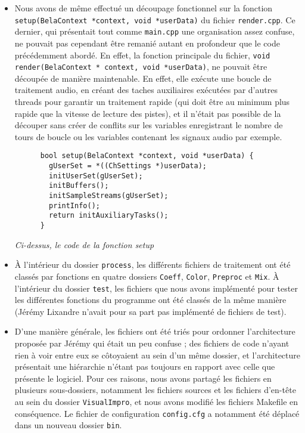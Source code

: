 \begin{itemize}
    \item Nous avons de même effectué un découpage fonctionnel sur la
      fonction \\ \verb!setup(BelaContext *context, void *userData)!
      du fichier \verb!render.cpp!. Ce dernier, qui présentait tout
      comme \verb!main.cpp! une organisation assez confuse, ne pouvait
      pas cependant être remanié autant en profondeur que le code
      précédemment abordé. En effet, la fonction principale du
      fichier, \verb!void!
      \\ \verb!render(BelaContext * context, void *userData)!, ne
      pouvait être découpée de manière maintenable. En effet, elle
      exécute une boucle de traitement audio, en créant des taches
      auxiliaires exécutées par d'autres threads pour garantir un
      traitement rapide (qui doit être au minimum plus rapide que la
      vitesse de lecture des pistes), et il n'était pas possible de la
      découper sans créer de conflits sur les variables enregistrant
      le nombre de tours de boucle ou les variables contenant les
      signaux audio par exemple.

      \begin{lstlisting}
      bool setup(BelaContext *context, void *userData) {
        gUserSet = *((ChSettings *)userData);
        initUserSet(gUserSet);
        initBuffers();
        initSampleStreams(gUserSet);
        printInfo();
        return initAuxiliaryTasks();
      }
    \end{lstlisting}

    \begin{center}
      \textit{Ci-dessus, le code de la fonction setup}
    \end{center}    

      \item \`{A} l'intérieur du dossier \verb!process!, les
        différents fichiers de traitement ont été classés par
        fonctions en quatre dossiers \verb!Coeff!, \verb!Color!,
        \verb!Preproc! et \verb!Mix!. \`{A} l'intérieur du dossier
        \verb!test!, les fichiers que nous avons implémenté pour tester les
        différentes fonctions du programme ont été classés de la même
        manière (Jérémy Lixandre n'avait pour sa part pas implémenté
        de fichiers de test).

        \item D'une manière générale, les fichiers ont été triés pour
          ordonner l'architecture proposée par Jérémy qui était un peu
          confuse ; des fichiers de code n'ayant rien à voir entre eux
          se côtoyaient au sein d'un même dossier, et l'architecture
          présentait une hiérarchie n'étant pas toujours en rapport
          avec celle que présente le logiciel. Pour ces raisons, nous
          avons partagé les fichiers en plusieurs sous-dossiers,
          notamment les fichiers sources et les fichiers d'en-tête au
          sein du dossier \verb!VisualImpro!, et nous avons modifié
          les fichiers Makefile en conséquence. Le fichier de
          configuration \verb!config.cfg! a notamment été déplacé dans
          un nouveau dossier \verb!bin!.


\end{itemize}
